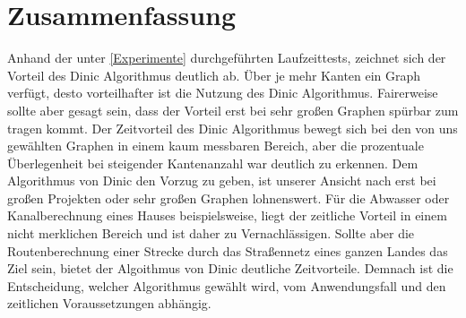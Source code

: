 \documentclass[a4paper]{llncs}
\begin{document}
\section{Zusammenfassung}
\label{Zusammenfassung}
Anhand der unter \ref{Experimente} durchgeführten Laufzeittests, zeichnet sich der Vorteil des Dinic Algorithmus deutlich ab. Über je mehr Kanten ein Graph verfügt, desto vorteilhafter ist die Nutzung des Dinic Algorithmus. Fairerweise sollte aber gesagt sein, dass der Vorteil erst bei sehr großen Graphen spürbar zum tragen kommt. Der Zeitvorteil des Dinic Algorithmus bewegt sich bei den von uns gewählten Graphen in einem kaum messbaren Bereich, aber die prozentuale Überlegenheit bei steigender Kantenanzahl war deutlich zu erkennen. Dem Algorithmus von Dinic den Vorzug zu geben, ist unserer Ansicht nach erst bei großen Projekten oder sehr großen Graphen lohnenswert. Für die Abwasser oder Kanalberechnung eines Hauses beispielsweise, liegt der zeitliche Vorteil in einem nicht merklichen Bereich und ist daher zu Vernachlässigen. Sollte aber die Routenberechnung einer Strecke durch das Straßennetz eines ganzen Landes das Ziel sein, bietet der Algoithmus von Dinic deutliche Zeitvorteile. Demnach ist die Entscheidung, welcher Algorithmus gewählt wird, vom Anwendungsfall und den zeitlichen Voraussetzungen abhängig.


 
\end{document}
